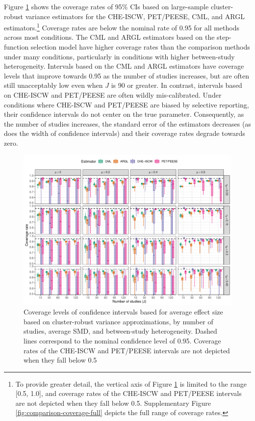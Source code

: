 \documentclass[
  american,
  man, donotrepeattitle,floatsintext]{apa7}
\begin{document}
Figure \ref{fig:comparison-coverage} shows the coverage rates of 95\% CIs based on large-sample cluster-robust variance estimators for the CHE-ISCW, PET/PEESE, CML, and ARGL estimators.\footnote{To provide greater detail, the vertical axis of Figure \ref{fig:comparison-coverage} is limited to the range {[}0.5, 1.0{]}, and coverage rates of the CHE-ISCW and PET/PEESE intervals are not depicted when they fall below 0.5. Supplementary Figure \ref{fig:comparison-coverage-full} depicts the full range of coverage rates.}
Coverage rates are below the nominal rate of 0.95 for all methods across most conditions.
The CML and ARGL estimators based on the step-function selection model have higher coverage rates than the comparison methods under many conditions, particularly in conditions with higher between-study heterogeneity.
Intervals based on the CML and ARGL estimators have coverage levels that improve towards 0.95 as the number of studies increases, but are often still unacceptably low even when \(J\) is 90 or greater.
In contrast, intervals based on CHE-ISCW and PET/PEESE are often wildly mis-calibrated.
Under conditions where CHE-ISCW and PET/PEESE are biased by selective reporting, their confidence intervals do not center on the true parameter. Consequently, as the number of studies increases, the standard error of the estimators decreases (as does the width of confidence intervals) and their coverage rates degrade towards zero.

\begin{figure}
\includegraphics{step-function-selection-models-with-dependent-effects_files/figure-latex/comparison-coverage-1} \caption{Coverage levels of confidence intervals based for average effect size based on cluster-robust variance approximations, by number of studies, average SMD, and between-study heterogeneity. Dashed lines correspond to the nominal confidence level of 0.95. Coverage rates of the CHE-ISCW and PET/PEESE intervals are not depicted when they fall below 0.5}\label{fig:comparison-coverage}
\end{figure}
\end{document}
